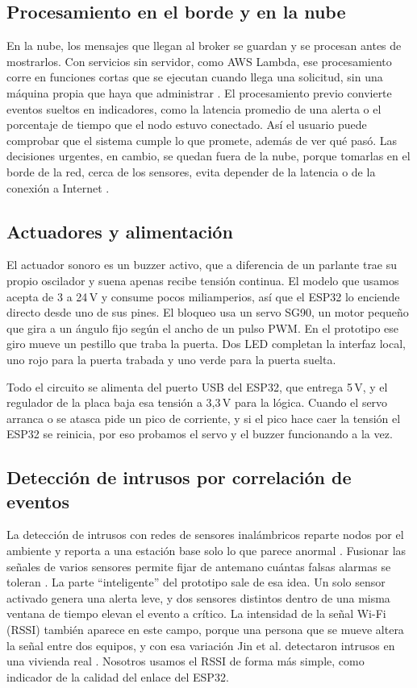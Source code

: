 \documentclass[manuscript,screen,nonacm]{acmart}
\begin{document}
\subsection{Procesamiento en el borde y en la nube}
En la nube, los mensajes que llegan al broker se guardan y se procesan antes de mostrarlos. Con servicios sin servidor, como AWS Lambda, ese procesamiento corre en funciones cortas que se ejecutan cuando llega una solicitud, sin una máquina propia que haya que administrar \cite{aws2026lambda}. El procesamiento previo convierte eventos sueltos en indicadores, como la latencia promedio de una alerta o el porcentaje de tiempo que el nodo estuvo conectado. Así el usuario puede comprobar que el sistema cumple lo que promete, además de ver qué pasó. Las decisiones urgentes, en cambio, se quedan fuera de la nube, porque tomarlas en el borde de la red, cerca de los sensores, evita depender de la latencia o de la conexión a Internet \cite{shi2016edge}.

\subsection{Actuadores y alimentación}
El actuador sonoro es un buzzer activo, que a diferencia de un parlante trae su propio oscilador y suena apenas recibe tensión continua. El modelo que usamos acepta de 3 a 24\,V y consume pocos miliamperios, así que el ESP32 lo enciende directo desde uno de sus pines. El bloqueo usa un servo SG90, un motor pequeño que gira a un ángulo fijo según el ancho de un pulso PWM. En el prototipo ese giro mueve un pestillo que traba la puerta. Dos LED completan la interfaz local, uno rojo para la puerta trabada y uno verde para la puerta suelta.

Todo el circuito se alimenta del puerto USB del ESP32, que entrega 5\,V, y el regulador de la placa baja esa tensión a 3,3\,V para la lógica. Cuando el servo arranca o se atasca pide un pico de corriente, y si el pico hace caer la tensión el ESP32 se reinicia, por eso probamos el servo y el buzzer funcionando a la vez.

\subsection{Detección de intrusos por correlación de eventos}
La detección de intrusos con redes de sensores inalámbricos reparte nodos por el ambiente y reporta a una estación base solo lo que parece anormal \cite{walchli2009building}. Fusionar las señales de varios sensores permite fijar de antemano cuántas falsas alarmas se toleran \cite{pugh2015fusion}. La parte ``inteligente'' del prototipo sale de esa idea. Un solo sensor activado genera una alerta leve, y dos sensores distintos dentro de una misma ventana de tiempo elevan el evento a crítico. La intensidad de la señal Wi-Fi (RSSI) también aparece en este campo, porque una persona que se mueve altera la señal entre dos equipos, y con esa variación Jin et al. detectaron intrusos en una vivienda real \cite{jin2018wlid}. Nosotros usamos el RSSI de forma más simple, como indicador de la calidad del enlace del ESP32.
\end{document}
